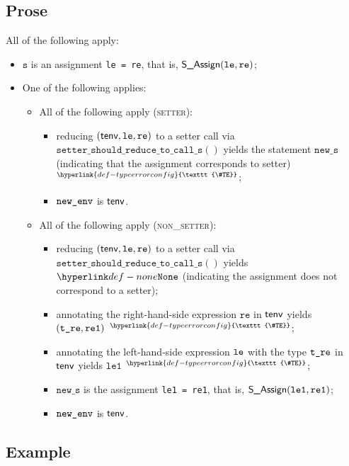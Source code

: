\documentclass{book}
\newcommand\TypeErrorConfig[0]{\hyperlink{def-typeerrorconfig}{\texttt{\#TE}}}
\newcommand\ProseOrTypeError[0]{\hyperlink{def-proseortypeerror}{$^{\TypeErrorConfig}$}}
\newcommand\inlinesetter[1]{\texttt{setter\_should\_reduce\_to\_call\_s}(#1)}
\newcommand\vleone[0]{\texttt{le1}}
\newcommand\vre[0]{\texttt{re}}
\newcommand\vs[0]{\texttt{s}}
\newcommand\news[0]{\texttt{new\_s}}
\begin{document}
\subsection{Prose}
All of the following apply:
\begin{itemize}
  \item $\vs$ is an assignment \texttt{le = re}, that is, $\SAssign(\vle, \vre)$;
  \item One of the following applies:
  \begin{itemize}
    \item All of the following apply (\textsc{setter}):
    \begin{itemize}
      \item reducing $(\tenv, \vle, \vre)$ to a setter call via \\ $\inlinesetter{}$ yields the statement $\news$
      (indicating that the assignment corresponds to setter) \ProseOrTypeError;
      \item $\texttt{new\_env}$ is $\textsf{tenv}$.
    \end{itemize}

    \item All of the following apply (\textsc{non\_setter}):
    \begin{itemize}
      \item reducing $(\tenv, \vle, \vre)$ to a setter call via \\ $\inlinesetter{}$ yields $\None$
            (indicating the assignment does not correspond to a setter);
      \item annotating the right-hand-side expression $\vre$ in $\textsf{tenv}$ yields $(\texttt{t\_re}, \texttt{re1})$ \ProseOrTypeError;
      \item annotating the left-hand-side expression $\texttt{le}$ with the type $\texttt{t\_re}$ in $\textsf{tenv}$ yields $\vleone$ \ProseOrTypeError;
      \item $\news$ is the assignment \texttt{le1 = re1}, that is, $\SAssign(\vleone, \vreone)$;
      \item $\texttt{new\_env}$ is $\textsf{tenv}$.
    \end{itemize}

  \end{itemize}
\end{itemize}

\subsection{Example}

\end{document}
